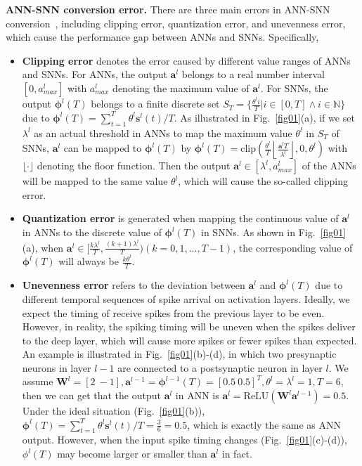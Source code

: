 \documentclass[letterpaper]{article} %
\begin{document}
\noindent
\textbf{ANN-SNN conversion error.}
There are three main errors in ANN-SNN conversion~\cite{bu2022optimal}, including clipping error, quantization error, and unevenness error, which cause the performance gap between ANNs and SNNs. Specifically,
\begin{itemize}
    \item[$\bullet$] \textbf{Clipping error} denotes the error caused by different value ranges of ANNs and SNNs. For ANNs, the output $\boldsymbol{a}^l$  belongs to a real number interval $[0,a_{max}^{l}]$ with $a_{max}^{l}$ denoting the maximum value of  $\boldsymbol{a}^l$. For SNNs,  the output $\boldsymbol{\phi}^l(T)$ belongs to a finite discrete set $S_T = \{ \frac{{\theta}^l i}{T} | i\in [0,T] \wedge  i\in \mathbb{N} \}$ due to $\boldsymbol{\phi}^l(T) = \sum\limits_{t=1}^T{\theta}^{l} \boldsymbol{s}^{l}(t) /T$. As illustrated in Fig.~\ref{fig01}(a), if we set $\lambda^l$ as an actual threshold in ANNs to map the maximum value ${\theta}^l$ in $S_T$ of SNNs, $\boldsymbol{a}^l$ can be mapped to $\boldsymbol{\phi}^l(T)$ by $\bm{\phi}^l(T)=\text{clip} \left(   \frac{ \theta^l}{T} \left \lfloor \frac{\bm{a}^{l} T}{\lambda^l}     \right \rfloor, 0, \theta^l  \right)$ with $\lfloor \cdot \rfloor$ denoting the floor function.
    Then the output $\boldsymbol{a}^l\in [\lambda^l, {a}_{max}^l]$ of the ANNs will be mapped to the same value ${\theta}^l$, which will cause the so-called clipping error.
    \item[$\bullet$] \textbf{Quantization error} is generated when mapping the continuous value of $\boldsymbol{a}^l$ in ANNs to the discrete value of $\boldsymbol{\phi}^l(T)$ in SNNs. As shown in Fig.~\ref{fig01}(a), when $\boldsymbol{a}^l\in[\frac{k\lambda^l}{T},\frac{(k+1)\lambda^l}{T})(k=0,1,...,T-1)$, the corresponding value of $\boldsymbol{\phi}^l(T)$ will always be $\frac{k{\theta}^l}{T}$.
    \item[$\bullet$] \textbf{Unevenness error} refers to the deviation between $\boldsymbol{a}^l$ and $\boldsymbol{\phi}^l(T)$ due to different temporal sequences of spike arrival on activation layers. Ideally, we expect the timing of receive spikes from the previous layer to be even. However, in reality, the spiking timing will be uneven when the spikes deliver to the deep layer, which will cause more spikes or fewer spikes than expected. An example is illustrated in Fig.~\ref{fig01}(b)-(d), in which two presynaptic neurons in layer $l-1$ are connected to a postsynaptic neuron in layer $l$. We assume $\boldsymbol{W}^l=\left[2\ -1\right], \boldsymbol{a}^{l-1} = \boldsymbol{\phi}^{l-1}(T) = \left[0.5\ 0.5\right]^T, {\theta}^l = \lambda^l = 1, T=6$, then we can get that the output $\boldsymbol{a}^{l}$ in ANN is $\boldsymbol{a}^{l}=\text{ReLU}(\boldsymbol{W}^l\boldsymbol{a}^{l-1})=0.5$.
    Under the ideal situation (Fig.~\ref{fig01}(b)), $\boldsymbol{\phi}^l(T) = \sum\limits_{t=1}^T{\theta}^{l} \boldsymbol{s}^{l}(t)/{T}=\frac{3}{6}=0.5$, which is exactly the same as ANN output. However, when the input spike timing changes
    (Fig.~\ref{fig01}(c)-(d)), $\phi^l(T)$ may become larger or smaller than $\boldsymbol{a}^l$ in fact.
\end{itemize}
\end{document}
